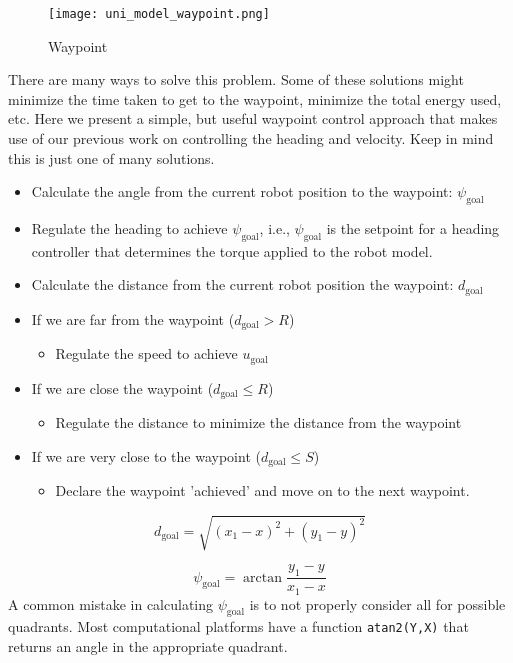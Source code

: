 \begin{figure}[hbt]
\centering
\texttt{[image: uni\_model\_waypoint.png]}
\caption{Waypoint}
\label{f:waypoint}
\end{figure}

There are many ways to solve this problem.  Some of these solutions might minimize the time taken to get to the waypoint, minimize the total energy used, etc.  Here we present a simple, but useful waypoint control approach that makes use of our previous work on controlling the heading and velocity.  Keep in mind this is just one of many solutions.
\begin{itemize}
\item Calculate the angle from the current robot position to the waypoint: $\psi_{\mathrm{goal}}$
\item Regulate the heading to achieve $\psi_{\mathrm{goal}}$, i.e., $\psi_{\mathrm{goal}}$ is the setpoint for a heading controller that determines the torque applied to the robot model.
\item Calculate the distance from the current robot position the waypoint: $d_{\mathrm{goal}}$
\item If we are far from the waypoint ($d_{\mathrm{goal}} > R$) 
  \begin{itemize}
  \item Regulate the speed to achieve $u_{\mathrm{goal}}$
  \end{itemize}
\item  If we are close the waypoint ($d_{\mathrm{goal}} \leq R$) 
  \begin{itemize}
  \item Regulate the distance to minimize the distance from the waypoint
  \end{itemize}
\item If we are very close to the waypoint ($d_{\mathrm{goal}} \leq S$) 
  \begin{itemize}
  \item Declare the waypoint 'achieved' and move on to the next waypoint.
  \end{itemize}
\end{itemize}

\[
d_{\mathrm{goal}}=\sqrt{\left(x_1-x\right)^2 + \left(y_1-y\right)^2}
\]

\[
\psi_{\mathrm{goal}}=\arctan{\frac{y_1-y}{x_1-x}}
\]
A common mistake in calculating $\psi_{\mathrm{goal}}$ is to not properly consider all for possible quadrants.  Most computational platforms have a function \texttt{atan2(Y,X)} that returns an angle in the appropriate quadrant.

